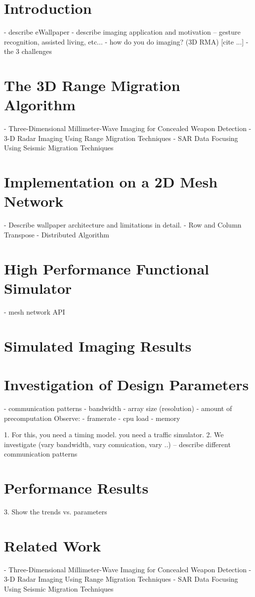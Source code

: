 \section{Introduction}
- describe eWallpaper
- describe imaging application and motivation
-- gesture recognition, assisted living, etc...
- how do you do imaging? (3D RMA) [cite ...]
- the 3 challenges

\section{The 3D Range Migration Algorithm}
- Three-Dimensional Millimeter-Wave Imaging for Concealed Weapon Detection
- 3-D Radar Imaging Using Range Migration Techniques
- SAR Data Focusing Using Seismic Migration Techniques

\section{Implementation on a 2D Mesh Network}
- Describe wallpaper architecture and limitations in detail.
- Row and Column Transpose
- Distributed Algorithm

\section{High Performance Functional Simulator}
- mesh network API

\section{Simulated Imaging Results}

\section{Investigation of Design Parameters}
- communication patterns
- bandwidth
- array size (resolution)
- amount of precomputation
Observe:
- framerate
- cpu load
- memory

1. For this, you need a timing model. you need a traffic simulator.
2. We investigate (vary bandwidth, vary comuication, vary ..)
-- describe different communication patterns

\section{Performance Results}
3. Show the trends vs. parameters

\section{Related Work}
- Three-Dimensional Millimeter-Wave Imaging for Concealed Weapon Detection
- 3-D Radar Imaging Using Range Migration Techniques
- SAR Data Focusing Using Seismic Migration Techniques

